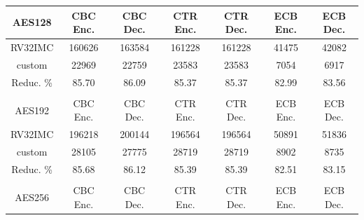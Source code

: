 \begin{table}[tp]
    \begin{tabular}{ccccccc}
    \rowcolor[HTML]{C0C0C0} 
    AES128                               & CBC Enc.             & CBC Dec.             & CTR Enc.             & CTR Dec.             & ECB Enc.             & ECB Dec.             \\ \hline
    \cellcolor[HTML]{EFEFEF}RV32IMC      & 160626               & 163584               & 161228               & 161228               & 41475                & 42082                \\
    \cellcolor[HTML]{EFEFEF}custom       & 22969                & 22759                & 23583                & 23583                & 7054                 & 6917                 \\
    \cellcolor[HTML]{EFEFEF}Reduc. \%    & 85.70                & 86.09                & 85.37                & 85.37                & 82.99                & 83.56                \\
    \multicolumn{1}{l}{}                 & \multicolumn{1}{l}{} & \multicolumn{1}{l}{} & \multicolumn{1}{l}{} & \multicolumn{1}{l}{} & \multicolumn{1}{l}{} & \multicolumn{1}{l}{} \\
    \rowcolor[HTML]{C0C0C0} 
    AES192                               & CBC Enc.             & CBC Dec.             & CTR Enc.             & CTR Dec.             & ECB Enc.             & ECB Dec.             \\ \hline
    \cellcolor[HTML]{EFEFEF}RV32IMC      & 196218               & 200144               & 196564               & 196564               & 50891                & 51836                \\
    \cellcolor[HTML]{EFEFEF}custom       & 28105                & 27775                & 28719                & 28719                & 8902                 & 8735                 \\
    \cellcolor[HTML]{EFEFEF}Reduc. \%    & 85.68                & 86.12                & 85.39                & 85.39                & 82.51                & 83.15                \\
    \multicolumn{1}{l}{}                 & \multicolumn{1}{l}{} & \multicolumn{1}{l}{} & \multicolumn{1}{l}{} & \multicolumn{1}{l}{} & \multicolumn{1}{l}{} & \multicolumn{1}{l}{} \\
    \rowcolor[HTML]{C0C0C0} 
    AES256                               & CBC Enc.             & CBC Dec.             & CTR Enc.             & CTR Dec.             & ECB Enc.             & ECB Dec.             \\ \hline

\end{tabular}
\end{table}
